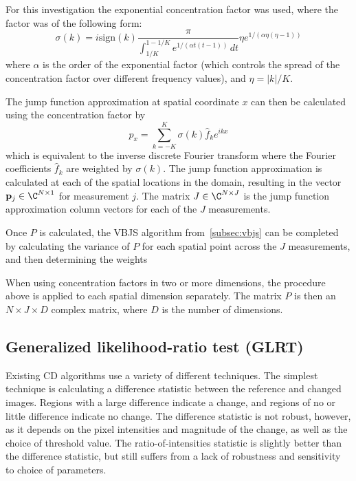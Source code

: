 \documentclass{article}
\begin{document}
For this investigation the exponential concentration factor was used, where the factor was of the following form:
\begin{equation}\label{eq:conc_factor}
    \sigma(k) = i \text{sign}(k) \frac{\pi}{\int_{1/K}^{1-1/K} e^{1/(\alpha t (t-1))} \, dt} \eta e^{1/(\alpha \eta (\eta-1))}
\end{equation}
where $\alpha$ is the order of the exponential factor (which controls the spread of the concentration factor over different frequency values), and $\eta = |k|/K$.

The jump function approximation at spatial coordinate $x$ can then be calculated using the concentration factor by
\[
p_{x} = \sum_{k=-K}^K \sigma(k) \hat{f}_k e^{ikx}
\]
which is equivalent to the inverse discrete Fourier transform where the Fourier coefficients $\hat{f}_k$ are weighted by $\sigma(k)$. The jump function approximation is calculated at each of the spatial locations in the domain, resulting in the vector $\mathbf{p}_j \in \C^{N \times 1}$ for measurement $j$. The matrix $J \in \C^{N \times J}$ is the jump function approximation  column vectors for each of the $J$ measurements.

Once $P$ is calculated, the VBJS algorithm from~\ref{subsec:vbjs} can be completed by calculating the variance of $P$ for each spatial point across the $J$ measurements, and then determining the weights

When using concentration factors in two or more dimensions, the procedure above is applied to each spatial dimension separately. The matrix $P$ is then an $N \times J \times D$ complex matrix, where $D$ is the number of dimensions. %




\subsection{Generalized likelihood-ratio test (GLRT)}

Existing CD algorithms use a variety of different techniques. The simplest technique is calculating a difference statistic between the reference and changed images. Regions with a large difference indicate a change, and regions of no or little difference indicate no change. The difference statistic is not robust, however, as it depends on the pixel intensities and magnitude of the change, as well as the choice of threshold value. The ratio-of-intensities statistic is slightly better than the difference statistic, but still suffers from a lack of robustness and sensitivity to choice of parameters.
\end{document}
